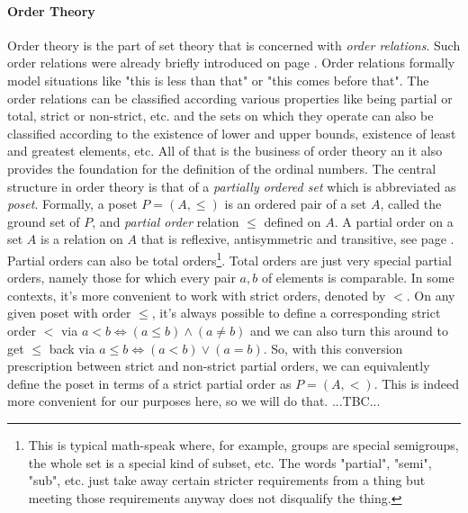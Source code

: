 \paragraph{Order Theory} Order theory is the part of set theory that is concerned with \emph{order relations}. Such order relations were already briefly introduced on page \pageref{Par:Orders}. Order relations formally model situations like "this is less than that" or "this comes before that". The order relations can be classified according various properties like being partial or total, strict or non-strict, etc. and the sets on which they operate can also be classified according to the existence of lower and upper bounds, existence of least and greatest elements, etc. All of that is the business of order theory an it also provides the foundation for the definition of the ordinal numbers. The central structure in order theory is that of a \emph{partially ordered set} which is abbreviated as \emph{poset}. Formally, a poset $P = (A, \leq)$ is an ordered pair of a set $A$, called the ground set of $P$, and \emph{partial order} relation $\leq$ defined on $A$. A partial order on a set $A$ is a relation on $A$ that is reflexive, antisymmetric and transitive, see page \pageref{Tab:RelationFeatures}. Partial orders can also be total orders\footnote{This is typical math-speak where, for example, groups are special semigroups, the whole set is a special kind of subset, etc. The words "partial", "semi", "sub", etc. just take away certain stricter requirements from a thing but meeting those requirements anyway does not disqualify the thing.}. Total orders are just very special partial orders, namely those for which every pair $a,b$ of elements is comparable. In some contexts, it's more convenient to work with strict orders, denoted by $<$. On any given poset with order $\leq$, it's always possible to define a corresponding strict order $<$ via $a < b \Leftrightarrow (a \leq b) \wedge (a \neq b)$ and we can also turn this around to get $\leq$ back via $a \leq b \Leftrightarrow (a < b) \vee (a = b)$. So, with this conversion prescription between strict and non-strict partial orders, we can equivalently define the poset in terms of a strict partial order as $P = (A, <)$. This is indeed more convenient for our purposes here, so we will do that. ...TBC...



